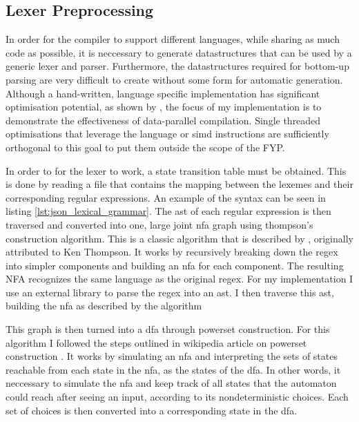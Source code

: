 \subsection{Lexer Preprocessing} \label{lexer_preprocessing}

In order for the compiler to support different languages, while sharing as much code as possible,
it is neccessary to generate datastructures that can be used by a generic lexer and parser.
Furthermore, the datastructures required for bottom-up parsing are very difficult to create without
some form for automatic generation. Although a hand-written, language specific implementation
has significant optimisation potential, as shown by \cite{langdale_parsing_2019}, the focus of my
implementation is to demonstrate the effectiveness of data-parallel compilation. Single threaded
optimisations that leverage the language or \gls{simd} instructions are sufficiently orthogonal to
this goal to put them outside the scope of the FYP.

In order to for the lexer to work, a state transition table must be obtained. This is done by
reading a file that contains the mapping between the lexemes and their corresponding regular
expressions. An example of the syntax can be seen in listing \ref{lst:json_lexical_grammar}. The
\gls{ast} of each regular expression is then traversed and converted into one, large joint \gls{nfa}
graph using thompson's construction algorithm. This is a classic algorithm that is described by
\cite{aho_compilers_2006}, originally attributed to Ken Thompson. It works by recursively breaking
down the regex into simpler components and building an \gls{nfa} for each component. The resulting
NFA recognizes the same language as the original regex. For my implementation I use an external
library to parse the regex into an \gls{ast}. I then traverse this \gls{ast}, building the \gls{nfa}
as described by the algorithm

This graph is then turned into a \gls{dfa} through powerset construction. For this
algorithm I followed the steps outlined in wikipedia article on powerset construction
\citep{noauthor_powerset_2023}. It works by simulating an \gls{nfa} and interpreting the sets of
states reachable from each state in the \gls{nfa}, as the states of the \gls{dfa}. In other words,
it neccessary to simulate the \gls{nfa} and keep track of all states that the automaton could
reach after seeing an input, according to its nondeterministic choices. Each set of choices is then
converted into a corresponding state in the \gls{dfa}.

